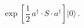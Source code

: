 \begin{equation}
\exp \left[\frac{1}{2}\,
 a^{\dagger} \cdot S \cdot a^{\dagger} \right]| 0 \rangle \,.
\label{eq:sliver-squeezed}
\end{equation}

